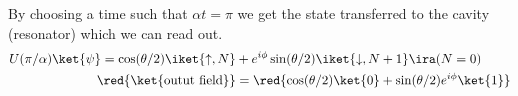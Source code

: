 \begin{enumerate}
 	By choosing a time such that $ \alpha t  = \pi $ we get the state transferred to
        the cavity (resonator) which we can read out.
 	\[
          \begin{aligned}
            U(\pi/\alpha)\ket{\psi} = \cos(\theta/2)\iket{\uparrow, N} & + e^{i\phi}\sin(\theta/2)\iket{\downarrow, N+1} \ira (N = 0)\\
            \red{\ket{\text{outut    field}}}    &=    \red{\cos(\theta/2)\ket{0}    +
              \sin(\theta/2)e^{i\phi}\ket{1}}
          \end{aligned}
 	\]
 	
      \end{enumerate}

